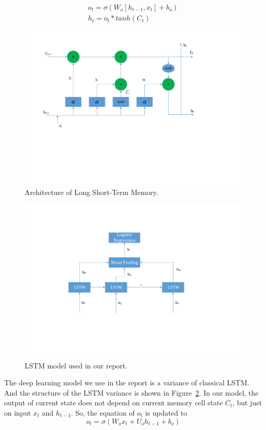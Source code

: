 \begin{align*}
o_t = \sigma (W_o [h_{t-1}, x_t] + b_o) \\
h_t = o_t * tanh(C_t)
\end{align*}

\begin{figure}
\centering
\includegraphics[scale=0.6]{figure/lstm.pdf}
\caption{Architecture of Long Short-Term Memory.}
\label{fig:lstm}
\end{figure}

\begin{figure}
\centering
\includegraphics[scale=0.6]{figure/lstm_model.pdf}
\caption{LSTM model used in our report.}
\label{fig:lstm_model}
\end{figure}

The deep learning model we use in the report is a variance of classical LSTM. And the structure of the LSTM variance is shown in Figure~\ref{fig:lstm_model}. In our model, the output of current state does not depend on current memory cell state $C_t$, but just on input $x_t$ and $h_{t-1}$. So, the equation of $o_t$ is updated to
$$
o_t = \sigma (W_o x_t + U_o h_{t-1} + b_o)
$$

